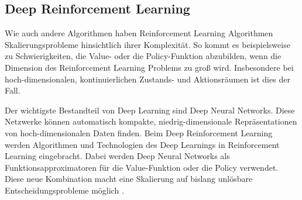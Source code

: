     
    


\subsection{Deep Reinforcement Learning}
Wie auch andere Algorithmen haben Reinforcement Learning Algorithmen Skalierungsprobleme hinsichtlich ihrer Komplexität.
So kommt es beispielsweise zu Schwierigkeiten, die Value- oder die Policy-Funktion abzubilden, wenn die Dimension des Reinforcement Learning Problems zu groß wird.
Insbesondere bei hoch-dimensionalen, kontinuierlichen Zustands- und Aktionsräumen ist dies der Fall.

Der wichtigste Bestandteil von Deep Learning sind Deep Neural Networks.
Diese Netzwerke können automatisch kompakte, niedrig-dimensionale Repräsentationen von hoch-dimensionalen Daten finden.
Beim Deep Reinforcement Learning werden Algorithmen und Technologien des Deep Learnings in Reinforcement Learning eingebracht.
Dabei werden Deep Neural Networks als Funktionsapproximatoren für die Value-Funktion oder die Policy verwendet.
Diese neue Kombination macht eine Skalierung auf bislang unlösbare Entscheidungsprobleme möglich \cite{Arulkumaran2017}.

